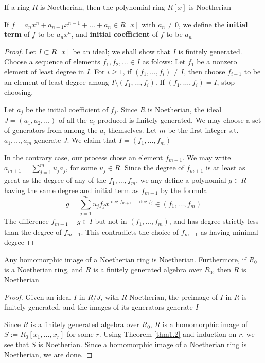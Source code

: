 \documentclass[11pt]{article}
\begin{document}
\begin{theorem}
\label{thm1.2}
If a ring \(R\) is Noetherian, then the polynomial ring \(R[x]\) is Noetherian
\end{theorem}

If \(f=a_nx^n+a_{n-1}x^{n-1}+\dots+a_n\in R[x]\) with \(a_n\neq0\), we define
the \textbf{initial term} of \(f\) to be \(a_nx^n\), and \textbf{initial coefficient} of \(f\)
to be \(a_n\)

\begin{proof}
Let \(I\subset R[x]\) be an ideal; we shall show that \(I\) is finitely
generated. Choose a sequence of elements \(f_1,f_2,\dots\in I\) as folows:
Let \(f_1\) be a nonzero element of least degree in \(I\). For \(i\ge1\), if
\((f_1,\dots,f_i)\neq I\), then choose \(f_{i+1}\) to be an element of least
degree among \(I\setminus(f_1,\dots,f_i)\). If \((f_1,\dots,f_i)=I\), stop
choosing.

Let \(a_j\) be the initial coefficient of \(f_j\). Since \(R\) is Noetherian,
the ideal \(J=(a_1,a_2,\dots)\) of all the \(a_i\) produced is finitely
generated. We may choose a set of generators from among the \(a_i\)
themselves. Let \(m\) be the first integer s.t. \(a_1,\dots,a_m\) generate
\(J\). We claim that \(I=(f_1,\dots,f_m)\)

In the contrary case, our process chose an element \(f_{m+1}\). We may write
\(a_{m+1}=\displaystyle\sum_{j=1}^mu_ja_j\), for some \(u_j\in R\). Since the
degree of \(f_{m+1}\) is at least as great as the degree of any of the
\(f_1,\dots,f_m\), we any define a polynomial \(g\in R\) having the same
degree and initial term as \(f_{m+1}\) by the formula
\begin{equation*}
g=\sum_{j=1}^mu_jf_jx^{\deg f_{m+1}-\deg f_j}\in (f_1,\dots,f_m)
\end{equation*}
The difference \(f_{m+1}-g\in I\) but not in \((f_1,\dots,f_m)\), and has
degree strictly less than the degree of \(f_{m+1}\). This contradicts the
choice of \(f_{m+1}\) as having minimal degree
\end{proof}

\begin{corollary}[]
Any homomorphic image of a Noetherian ring is Noetherian. Furthermore, if
\(R_0\) is a Noetherian ring, and \(R\) is a finitely generated algebra over
\(R_0\), then \(R\) is Noetherian
\end{corollary}

\begin{proof}
Given an ideal \(I\) in \(R/J\), with \(R\) Noetherian, the preimage of \(I\)
in \(R\) is finitely generated, and the images of its generators generate
\(I\)

Since \(R\) is a finitely generated algebra over \(R_0\), \(R\) is a
homomorphic image of \(S:=R_0[x_1,\dots,x_r]\) for some \(r\). Using Theorem
\ref{thm1.2} and induction on \(r\), we see that \(S\) is Noetherian. Since a
homomorphic image of a Noetherian ring is Noetherian, we are done.
\end{proof}
\end{document}
